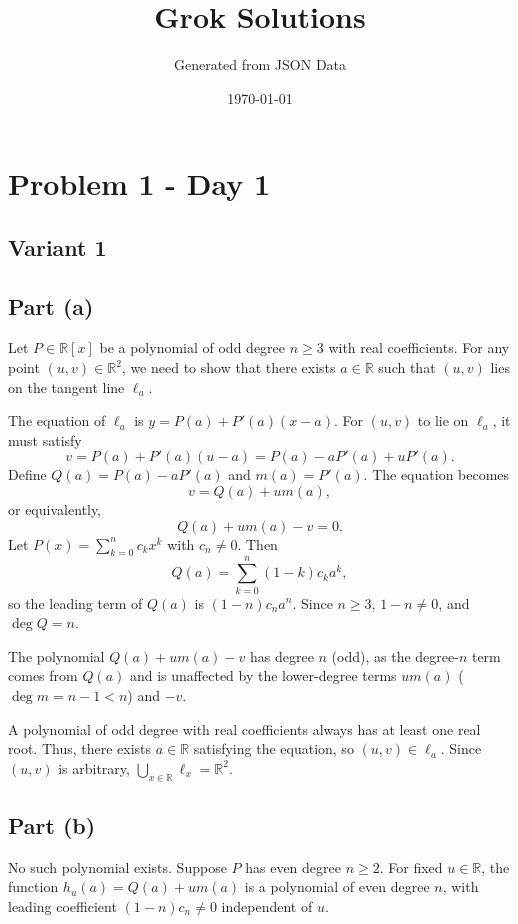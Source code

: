 \documentclass[12pt,a4paper]{article}
\title{Grok Solutions}
\author{Generated from JSON Data}
\date{\today}
\theoremstyle{definition}
\begin{document}
    \maketitle
    \tableofcontents
    \newpage


  \section{Problem 1 - Day 1}
\subsection{Variant 1}
    \subsection*{Part (a)}

    Let $P \in \mathbb{R}[x]$ be a polynomial of odd degree $n \geq 3$ with real coefficients. For any point $(u, v) \in \mathbb{R}^2$, we need to show that there exists $a \in \mathbb{R}$ such that $(u, v)$ lies on the tangent line $\ell_a$.

    The equation of $\ell_a$ is $y = P(a) + P'(a)(x - a)$. For $(u, v)$ to lie on $\ell_a$, it must satisfy
    \[
        v = P(a) + P'(a)(u - a) = P(a) - a P'(a) + u P'(a).
    \]
    Define $Q(a) = P(a) - a P'(a)$ and $m(a) = P'(a)$. The equation becomes
    \[
        v = Q(a) + u m(a),
    \]
    or equivalently,
    \[
        Q(a) + u m(a) - v = 0.
    \]
    Let $P(x) = \sum_{k=0}^n c_k x^k$ with $c_n \neq 0$. Then
    \[
        Q(a) = \sum_{k=0}^n (1 - k) c_k a^k,
    \]
    so the leading term of $Q(a)$ is $(1 - n) c_n a^n$. Since $n \geq 3$, $1 - n \neq 0$, and $\deg Q = n$.

    The polynomial $Q(a) + u m(a) - v$ has degree $n$ (odd), as the degree-$n$ term comes from $Q(a)$ and is unaffected by the lower-degree terms $u m(a)$ ($\deg m = n-1 < n$) and $-v$.

    A polynomial of odd degree with real coefficients always has at least one real root. Thus, there exists $a \in \mathbb{R}$ satisfying the equation, so $(u, v) \in \ell_a$. Since $(u, v)$ is arbitrary, $\bigcup_{x \in \mathbb{R}} \ell_x = \mathbb{R}^2$.

    \subsection*{Part (b)}

    No such polynomial exists. Suppose $P$ has even degree $n \geq 2$. For fixed $u \in \mathbb{R}$, the function $h_u(a) = Q(a) + u m(a)$ is a polynomial of even degree $n$, with leading coefficient $(1 - n) c_n \neq 0$ independent of $u$.
\end{document}
